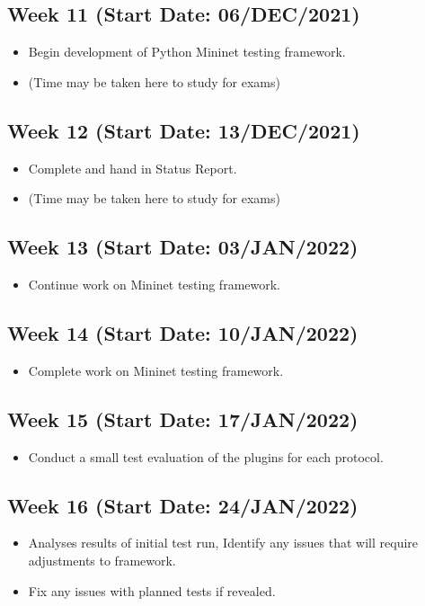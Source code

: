 \documentclass[11pt]{article}
\begin{document}
\subsection{Week 11 (Start Date: 06/DEC/2021)}
\begin{itemize}
    \item Begin development of Python Mininet testing framework.
    \item (Time may be taken here to study for exams)
\end{itemize}
\subsection{Week 12 (Start Date: 13/DEC/2021)}
\begin{itemize}
    \item Complete and hand in Status Report.
    \item (Time may be taken here to study for exams)
\end{itemize}
\subsection{Week 13 (Start Date: 03/JAN/2022)}
\begin{itemize}
    \item Continue work on Mininet testing framework.
\end{itemize}
\subsection{Week 14 (Start Date: 10/JAN/2022)}
\begin{itemize}
    \item Complete work on Mininet testing framework.
\end{itemize}
\subsection{Week 15 (Start Date: 17/JAN/2022)}
\begin{itemize}
    \item Conduct a small test evaluation of the plugins for each protocol.
\end{itemize}
\subsection{Week 16 (Start Date: 24/JAN/2022)}
\begin{itemize}
    \item Analyses results of initial test run, Identify any issues that will require adjustments to framework.
    \item Fix any issues with planned tests if revealed.
\end{itemize}
\end{document}

